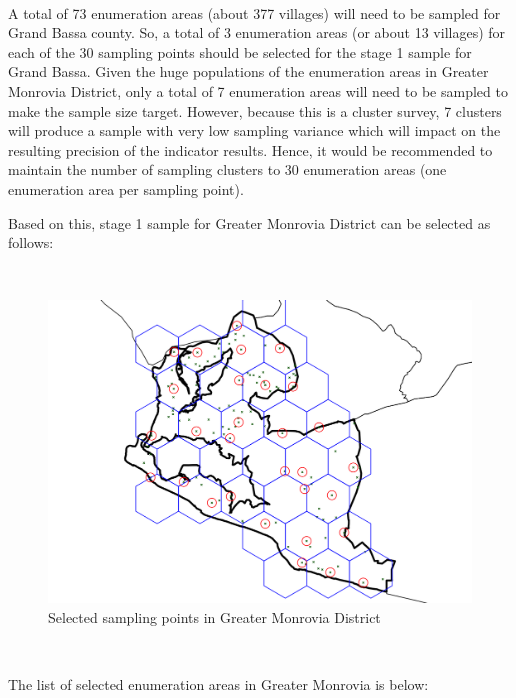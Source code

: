 \documentclass[12pt,a4paper]{book}
\theoremstyle{definition}
\theoremstyle{definition}
\theoremstyle{definition}
\theoremstyle{remark}
\begin{document}
~

A total of 73 enumeration areas (about 377 villages) will need to be
sampled for Grand Bassa county. So, a total of 3 enumeration areas (or
about 13 villages) for each of the 30 sampling points should be selected
for the stage 1 sample for Grand Bassa. Given the huge populations of
the enumeration areas in Greater Monrovia District, only a total of 7
enumeration areas will need to be sampled to make the sample size
target. However, because this is a cluster survey, 7 clusters will
produce a sample with very low sampling variance which will impact on
the resulting precision of the indicator results. Hence, it would be
recommended to maintain the number of sampling clusters to 30
enumeration areas (one enumeration area per sampling point).

\newpage

Based on this, stage 1 sample for Greater Monrovia District can be
selected as follows:

~

\begin{figure}[H]

\includegraphics{figures/sample24-1} \hfill{}

\caption{Selected sampling points in Greater Monrovia District}\label{fig:sample24}
\end{figure}

~

The list of selected enumeration areas in Greater Monrovia is below:

~
\end{document}
